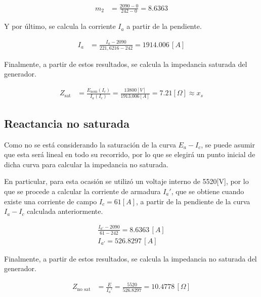 \documentclass[
  11pt,
  letterpaper,
   addpoints,
   answers
  ]{exam}
\begin{document}
\begin{questions}
\begin{solution}
        \begin{align}
        m_2 &= \frac{2090 - 0}{242 - 0} = 8.6363
        \end{align}
        
        Y por último, se calcula la corriente \( I_a \) a partir de la pendiente.
        
        \begin{align}
        I_a &= \frac{I_{a}- 2090}{221,6216 - 242} = 1914.006 \, [A]
        \end{align}
        
        Finalmente, a partir de estos resultados, se calcula la impedancia saturada del generador.
        
        \begin{align}
        Z_{\text{sat}} &= \frac{E_{\text{nom}}(I_c)}{I_a(I_c)} = \frac{13800[V]}{1913.006[A]} = 7.21[\Omega] \approx x_s
        \end{align}
        
        \subsection*{Reactancia no saturada}
        
        Como no se está considerando la saturación de la curva \( E_a - I_c \), se puede asumir que esta será lineal en todo su recorrido, por lo que se elegirá un punto inicial de dicha curva para calcular la impedancia no saturada.
        
        En particular, para esta ocasión se utilizó un voltaje interno de 5520[V], por lo que se procede a calcular la corriente de armadura \( I_a' \), que se obtiene cuando existe una corriente de campo \( I_c = 61[A] \), a partir de la pendiente de la curva \( I_a - I_c \) calculada anteriormente.
        
        \begin{align}
        \frac{I_{a'}-2090}{61 - 242} = 8.6363 \, [A]\\
        I_{a'} = 526.8297 \, [A]
        \end{align}
        
        Finalmente, a partir de estos resultados, se calcula la impedancia no saturada del generador.
        
        \begin{align}
        Z_{\text{no sat}} &= \frac{E}{I_a'} = \frac{5520}{526.8297} = 10.4778 \, [\Omega]
        \end{align}

\end{solution}
\end{questions}
\end{document}

